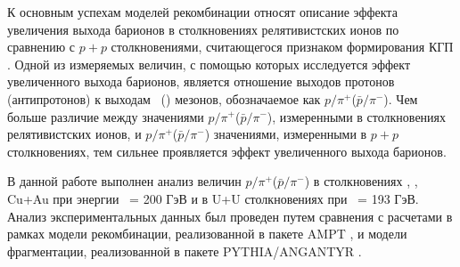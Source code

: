 К основным успехам моделей рекомбинации относят описание эффекта увеличения выхода барионов в столкновениях релятивистских ионов по сравнению с $p+p$ столкновениями, считающегося признаком формирования КГП \cite{p2piRatio_130GeV, p2piRatio_2003}. Одной из измеряемых величин, с помощью которых исследуется эффект увеличенного выхода барионов, является отношение выходов протонов (антипротонов) к выходам  \pip \ (\pim) мезонов, обозначаемое как  $p/\pi^{+}$($\bar{p}/\pi^{-}$). Чем больше различие между значениями $p/\pi^{+}$($\bar{p}/\pi^{-}$), измеренными в столкновениях релятивистских ионов, и  $p/\pi^{+}$($\bar{p}/\pi^{-}$) значениями, измеренными в $p+p$ столкновениях, тем сильнее проявляется эффект увеличенного выхода барионов. 

В данной работе выполнен анализ величин $p/\pi^{+}$($\bar{p}/\pi^{-}$) в столкновениях \pal, \heau, Cu+Au при энергии \sqsn \ = 200 ГэВ и в U+U столкновениях при \sqsn \ = 193 ГэВ. Анализ экспериментальных данных был проведен путем сравнения с расчетами в рамках модели рекомбинации, реализованной в пакете AMPT \cite{AMPT}, и модели фрагментации, реализованной в пакете PYTHIA/ANGANTYR \cite{PYTHIA}. 